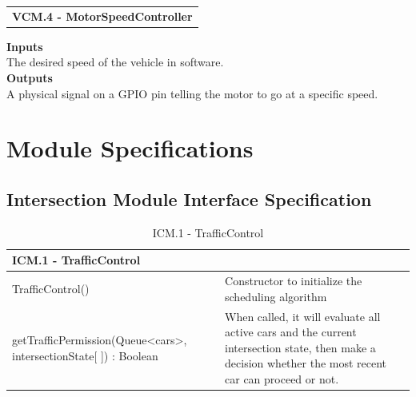\documentclass [10pt]{article}
\begin{document}
\begin{longtable}{p{}}
\rowcolor{tableCell}\textbf{VCM.4 - MotorSpeedController} \\
\end{longtable}

\textbf{Inputs} \\
The desired speed of the vehicle in software. \\

\textbf{Outputs} \\
A physical signal on a GPIO pin telling the motor to go at a specific speed. \\



\section{Module Specifications}

\subsection{Intersection Module Interface Specification}


\begin{longtable}{| p{ } | p{ } | }\caption{ICM.1 -  TrafficControl} \\\hline  
 \multicolumn{2}{|l|}{\textbf {ICM.1 - TrafficControl}}\\ \hline
 
\cellcolor{tableCell}TrafficControl()& \cellcolor{tableCell}Constructor to initialize the scheduling algorithm \\ \hline 

getTrafficPermission(Queue<cars>, intersectionState[ ]) : Boolean & When called, it will evaluate all active cars and the current intersection state, then make a decision whether the most recent car can proceed or not. \\ \hline



\end{longtable}
\end{document}
